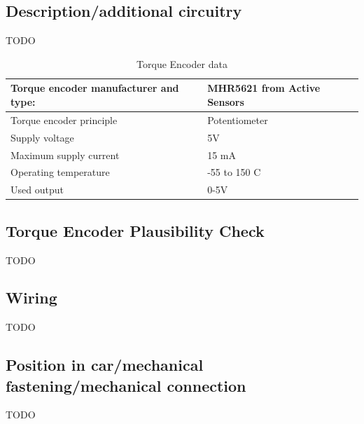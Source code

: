 \documentclass{article}
\begin{document}
\subsection{Description/additional circuitry}
TODO

\begin{table}[H]
	\centering
	\begin{tabular}{|l|l|}
	\hline
	Torque encoder manufacturer and type: & MHR5621 from Active Sensors \\ \hline
	Torque encoder principle & Potentiometer \\ \hline
	Supply voltage & 5V \\ \hline
	Maximum supply current & 15 mA \\ \hline
	Operating temperature & -55 to 150 \degree C \\ \hline
	Used output & 0-5V \\ \hline
	\end{tabular}
	\caption{Torque Encoder data}
	\label{encoder}
\end{table}

\subsection{Torque Encoder Plausibility Check}
TODO

\subsection{Wiring}
TODO

\subsection{Position in car/mechanical fastening/mechanical connection}
TODO
\end{document}
